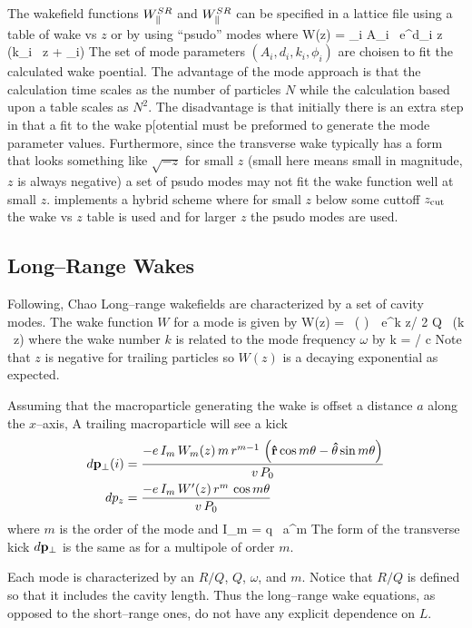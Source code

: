 The wakefield functions $W^{SR}_\parallel$ and $W^{SR}_\parallel$ can be specified in a \bmad
lattice file using a table of wake vs $z$ or by using ``psudo'' modes
where
\Begineq
  W(z) = \sum_i A_i \, e^{d_i z} \, \sin (k_i \, z + \phi_i)
  \label{wadzk}
\Endeq
The set of mode parameters $(A_i, d_i, k_i, \phi_i)$ are choisen to fit
the calculated wake poential. The advantage of the mode approach is that
the calculation time scales as the number of particles $N$ while the
calculation based upon a table scales as $N^2$. The disadvantage is that
initially there is an extra step in that a fit to the wake p[otential must
be preformed to generate the mode parameter values. Furthermore, since the
transverse wake typically has a form that looks something like $\sqrt{-z}$ 
for small $z$ (small here means small in magnitude, $z$ is always negative)
a set of psudo modes may not fit the wake function well at small $z$. 
\bmad implements a hybrid scheme where for small $z$ below some cuttoff
$z_{\rm{cut}}$ the wake vs $z$ table is used and for larger $z$ the psudo
modes are used.


\subsection{Long--Range Wakes}

Following, Chao\cite{b:chao} Long--range wakefields are characterized
by a set of cavity modes. The wake function $W$ for a mode is given by
\Begineq
  W(z) =  \, \left(  \right) \,\,
  e^{k z/ 2 Q} \, \sin (k \, z)
\Endeq
where the wake number $k$ is related to the mode frequency $\omega$ by
\Begineq
  k = \omega / c
\Endeq
Note that $z$ is negative for trailing particles so $W(z)$ is a
decaying exponential as expected.

Assuming that the macroparticle generating the wake is offset a
distance $a$ along the $x$--axis, A trailing macroparticle will see a kick
\begin{align}
  d{{\bf p}}_\perp(i) &= 
  \frac{-e \, I_m \, W_m(z) \, m \, r^{m-1} \, \left( 
  {\bf\hat r} \cos m\theta - {\bf\hat\theta} \sin m\theta \right)}
  {v \, P_0}  \\
  dp_z &= \frac{-e \, I_m \, W'(z) \, r^m \, \cos m\theta}{v \, P_0}
\end{align}
where $m$ is the order of the mode and
\Begineq
  I_m = q \, a^m
\Endeq
The form of the transverse kick $d{\bf p}_\perp$ is the same as for a
multipole of order $m$.

Each mode is characterized by an $R/Q$, $Q$, $\omega$, and $m$. Notice
that $R/Q$ is defined so that it includes the cavity length. Thus the
long--range wake equations, as opposed to the short--range ones, do
not have any explicit dependence on $L$. 

